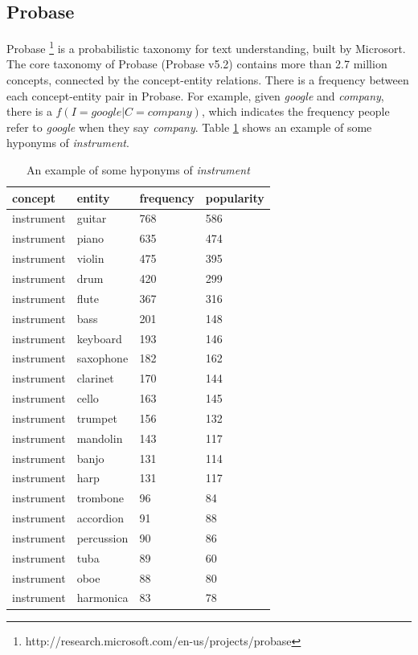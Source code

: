 \subsection{Probase}
Probase \cite{wu2012probase}\footnote{http://research.microsoft.com/en-us/projects/probase} is a probabilistic taxonomy for text understanding, built by Microsort. The core taxonomy of Probase (Probase v5.2) contains more than 2.7 million concepts, connected by the concept-entity relations. There is a frequency between each concept-entity pair in Probase. For example, given {\em google} and {\em company}, there is a $f(I=google|C=company)$, which indicates the frequency people refer to {\em google} when they say {\em company}. Table \ref{tab:pro} shows an example of some hyponyms of {\em instrument}.
\begin{table}[!htb]
\centering
\begin{tabular}{llll}
\hline
concept & entity & frequency & popularity\\\hline
instrument & guitar & 768 & 586\\
instrument & piano & 635 & 474\\
instrument & violin & 475 & 395\\
instrument & drum & 420 & 299\\
instrument & flute & 367 & 316\\
instrument & bass & 201 & 148\\
instrument & keyboard & 193 & 146\\
instrument & saxophone & 182 & 162\\
instrument & clarinet & 170 & 144\\
instrument & cello & 163 & 145\\
instrument & trumpet & 156 & 132\\
instrument & mandolin & 143 & 117\\
instrument & banjo & 131 & 114\\
instrument & harp & 131 & 117\\
instrument & trombone & 96 & 84\\
instrument & accordion & 91 & 88\\
instrument & percussion & 90 & 86\\
instrument & tuba & 89 & 60\\
instrument & oboe & 88 & 80\\
instrument & harmonica & 83 & 78\\\hline
\end{tabular}
\caption{An example of some hyponyms of {\em instrument}}
\label{tab:pro}
\end{table}
